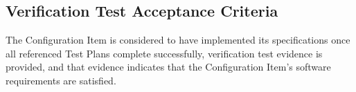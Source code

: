 \subsection{Verification Test Acceptance Criteria}
The Configuration Item is considered to have implemented its specifications
once all referenced Test Plans complete successfully, verification test
evidence is provided, and that evidence indicates that the Configuration Item's
software requirements are satisfied.
